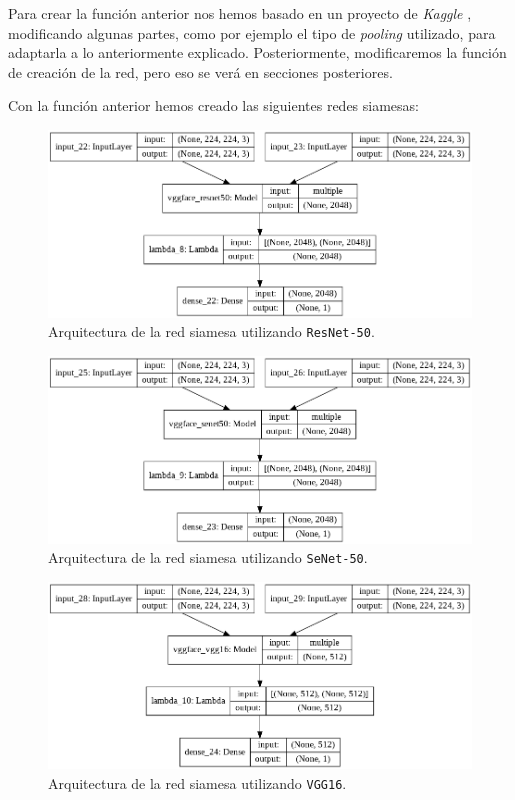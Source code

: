 \documentclass[11pt,a4paper]{article}
\begin{document}
Para crear la función anterior nos hemos basado en un proyecto de \textit{Kaggle} \cite{hulk}, modificando algunas
partes, como por ejemplo el tipo de \textit{pooling} utilizado, para adaptarla a lo anteriormente explicado.
Posteriormente, modificaremos la función de creación de la red, pero eso se verá en secciones posteriores.

Con la función anterior hemos creado las siguientes redes siamesas:

\begin{figure}[H]
    \centering
    \includegraphics[scale=0.4]{img/base-resnet50.png}
    \caption{Arquitectura de la red siamesa utilizando \texttt{ResNet-50}.}
    \label{fig:base-resnet50}
\end{figure}


\begin{figure}[H]
    \centering
    \includegraphics[scale=0.4]{img/base-senet50.png}
    \caption{Arquitectura de la red siamesa utilizando \texttt{SeNet-50}.}
    \label{fig:base-senet50}
\end{figure}


\begin{figure}[H]
    \centering
    \includegraphics[scale=0.4]{img/base-vgg16.png}
    \caption{Arquitectura de la red siamesa utilizando \texttt{VGG16}.}
    \label{fig:base-vgg16}
\end{figure}
\end{document}
